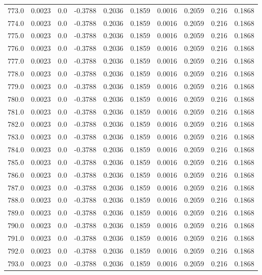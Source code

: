 \begin{longtable}{lrrrrrrrrr}
773.0 & 0.0023 & 0.0 & -0.3788 & 0.2036 & 0.1859 & 0.0016 & 0.2059 & 0.216 & 0.1868 \\
774.0 & 0.0023 & 0.0 & -0.3788 & 0.2036 & 0.1859 & 0.0016 & 0.2059 & 0.216 & 0.1868 \\
775.0 & 0.0023 & 0.0 & -0.3788 & 0.2036 & 0.1859 & 0.0016 & 0.2059 & 0.216 & 0.1868 \\
776.0 & 0.0023 & 0.0 & -0.3788 & 0.2036 & 0.1859 & 0.0016 & 0.2059 & 0.216 & 0.1868 \\
777.0 & 0.0023 & 0.0 & -0.3788 & 0.2036 & 0.1859 & 0.0016 & 0.2059 & 0.216 & 0.1868 \\
778.0 & 0.0023 & 0.0 & -0.3788 & 0.2036 & 0.1859 & 0.0016 & 0.2059 & 0.216 & 0.1868 \\
779.0 & 0.0023 & 0.0 & -0.3788 & 0.2036 & 0.1859 & 0.0016 & 0.2059 & 0.216 & 0.1868 \\
780.0 & 0.0023 & 0.0 & -0.3788 & 0.2036 & 0.1859 & 0.0016 & 0.2059 & 0.216 & 0.1868 \\
781.0 & 0.0023 & 0.0 & -0.3788 & 0.2036 & 0.1859 & 0.0016 & 0.2059 & 0.216 & 0.1868 \\
782.0 & 0.0023 & 0.0 & -0.3788 & 0.2036 & 0.1859 & 0.0016 & 0.2059 & 0.216 & 0.1868 \\
783.0 & 0.0023 & 0.0 & -0.3788 & 0.2036 & 0.1859 & 0.0016 & 0.2059 & 0.216 & 0.1868 \\
784.0 & 0.0023 & 0.0 & -0.3788 & 0.2036 & 0.1859 & 0.0016 & 0.2059 & 0.216 & 0.1868 \\
785.0 & 0.0023 & 0.0 & -0.3788 & 0.2036 & 0.1859 & 0.0016 & 0.2059 & 0.216 & 0.1868 \\
786.0 & 0.0023 & 0.0 & -0.3788 & 0.2036 & 0.1859 & 0.0016 & 0.2059 & 0.216 & 0.1868 \\
787.0 & 0.0023 & 0.0 & -0.3788 & 0.2036 & 0.1859 & 0.0016 & 0.2059 & 0.216 & 0.1868 \\
788.0 & 0.0023 & 0.0 & -0.3788 & 0.2036 & 0.1859 & 0.0016 & 0.2059 & 0.216 & 0.1868 \\
789.0 & 0.0023 & 0.0 & -0.3788 & 0.2036 & 0.1859 & 0.0016 & 0.2059 & 0.216 & 0.1868 \\
790.0 & 0.0023 & 0.0 & -0.3788 & 0.2036 & 0.1859 & 0.0016 & 0.2059 & 0.216 & 0.1868 \\
791.0 & 0.0023 & 0.0 & -0.3788 & 0.2036 & 0.1859 & 0.0016 & 0.2059 & 0.216 & 0.1868 \\
792.0 & 0.0023 & 0.0 & -0.3788 & 0.2036 & 0.1859 & 0.0016 & 0.2059 & 0.216 & 0.1868 \\
793.0 & 0.0023 & 0.0 & -0.3788 & 0.2036 & 0.1859 & 0.0016 & 0.2059 & 0.216 & 0.1868 \\

\end{longtable}
